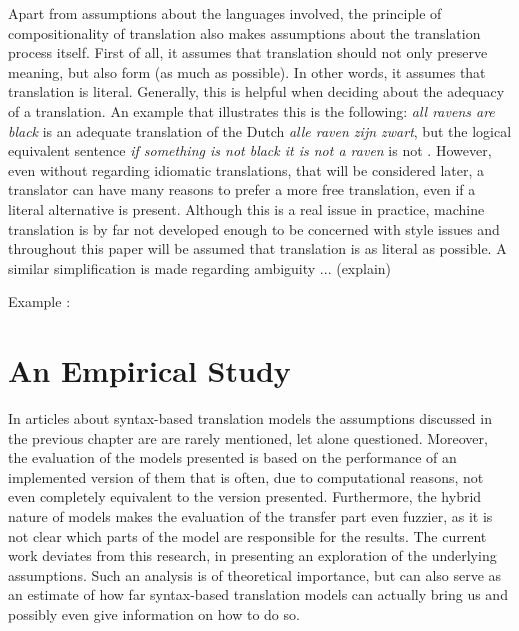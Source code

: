 \documentclass{report}
\theoremstyle{definition}
\theoremstyle{plain}
\begin{document}
Apart from assumptions about the languages involved, the principle of compositionality of translation also makes assumptions about the translation process itself. First of all, it assumes that translation should not only preserve meaning, but also form (as much as possible). In other words, it assumes that translation is literal. Generally, this is helpful when deciding about the adequacy of a translation. An example that illustrates this is the following: \textit{all ravens are black} is an adequate translation of the Dutch \textit{alle raven zijn zwart}, but the logical equivalent sentence \textit{if something is not black it is not a raven} is not \citep{landsbergen1989power}.  However, even without regarding idiomatic translations, that will be considered later, a translator can have many reasons to prefer a more free translation, even if a literal alternative is present. Although this is a real issue in practice, machine translation is by far not developed enough to be concerned with style issues and throughout this paper will be assumed that translation is as literal as possible. A similar simplification is made regarding ambiguity ... (explain)

Example \cite{landsbergen1989power}: 









\chapter{An Empirical Study}

In articles about syntax-based translation models the assumptions discussed in the previous chapter are are rarely mentioned, let alone questioned. Moreover, the evaluation of the models presented is based on the performance of an implemented version of them that is often, due to computational reasons, not even completely equivalent to the version presented. Furthermore, the hybrid nature of models makes the evaluation of the transfer part even fuzzier, as it is not clear which parts of the model are responsible for the results. The current work deviates from this research, in presenting an exploration of the underlying assumptions. Such an analysis is of theoretical importance, but can also serve as an estimate of how far syntax-based translation models can actually bring us and possibly even give information on how to do so.
\end{document}
